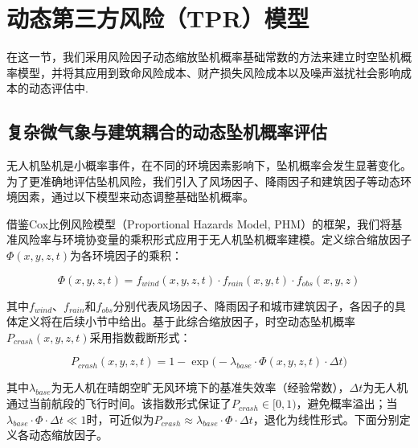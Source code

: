 
\section{动态第三方风险（TPR）模型}
\label{sec:tpr_models}
在这一节，我们采用风险因子动态缩放坠机概率基础常数的方法来建立时空坠机概率模型，并将其应用到致命风险成本、财产损失风险成本以及噪声滋扰社会影响成本的动态评估中.
\subsection{复杂微气象与建筑耦合的动态坠机概率评估}
\label{subsec:pcrash_model}
无人机坠机是小概率事件，在不同的环境因素影响下，坠机概率会发生显著变化。为了更准确地评估坠机风险，我们引入了风场因子、降雨因子和建筑因子等动态环境因素，通过以下模型来动态调整基础坠机概率。

借鉴Cox比例风险模型（Proportional Hazards Model, PHM）的框架，我们将基准风险率与环境协变量的乘积形式应用于无人机坠机概率建模。定义综合缩放因子$\Phi(x,y,z,t)$为各环境因子的乘积：

\begin{equation}
\Phi(x,y,z,t) = f_{wind}(x,y,z,t) \cdot f_{rain}(x,y,t) \cdot f_{obs}(x,y,z)
\label{eq:phi_composite}
\end{equation}

其中$f_{wind}$、$f_{rain}$和$f_{obs}$分别代表风场因子、降雨因子和城市建筑因子，各因子的具体定义将在后续小节中给出。基于此综合缩放因子，时空动态坠机概率$P_{crash}(x,y,z,t)$采用指数截断形式：

\begin{equation}
P_{crash}(x,y,z,t) = 1 - \exp\bigl( -\lambda_{base} \cdot \Phi(x,y,z,t) \cdot \Delta t \bigr)
\label{eq:pcrash_dynamic}
\end{equation}

其中$\lambda_{base}$为无人机在晴朗空旷无风环境下的基准失效率（经验常数），$\Delta t$为无人机通过当前航段的飞行时间。该指数形式保证了$P_{crash} \in [0,1)$，避免概率溢出；当$\lambda_{base} \cdot \Phi \cdot \Delta t \ll 1$时，可近似为$P_{crash} \approx \lambda_{base} \cdot \Phi \cdot \Delta t$，退化为线性形式。下面分别定义各动态缩放因子。
